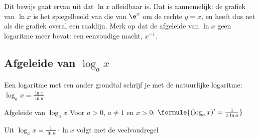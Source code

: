 Dit bewijs gaat ervan uit dat $\ln x$ afleidbaar is. Dat is aannemelijk: de grafiek van $\ln x$ is het spiegelbeeld van die van $\e^x$ om de rechte $y = x$, en heeft dus net als die grafiek overal een raaklijn. Merk op dat de afgeleide van $\ln x$ geen logaritme meer bevat: een eenvoudige macht, $x^{-1}$.


\begin{oefeningen}
\end{oefeningen}

\subsection{Afgeleide van \texorpdfstring{$\log_a x$}{log x}}

Een logaritme met een ander grondtal schrijf je met de natuurlijke logaritme: $\log_a x = \frac{\ln x}{\ln a}$.

\begin{theorie}
\begin{stelling}{Afgeleide van \texorpdfstring{$\log_a x$}{log x}}
Voor $a > 0$, $a \neq 1$ en $x > 0$: \quad $\formule{(\log_a x)' = \frac{1}{x \ln a}}$
\end{stelling}
\begin{bewijs}
Uit $\log_a x = \frac{1}{\ln a} \cdot \ln x$ volgt met de veelvoudregel
\end{bewijs}
\end{theorie}


\begin{oefeningen}
\end{oefeningen}

